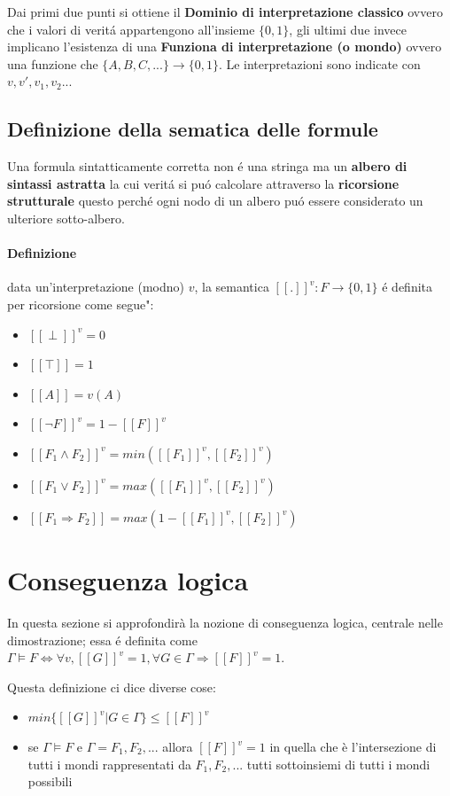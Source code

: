 \documentclass{article}
\begin{document}
Dai primi due punti si ottiene il \textbf{Dominio di interpretazione classico} ovvero che i valori di veritá appartengono all'insieme $\{0,1\}$, gli ultimi due invece implicano l'esistenza di una \textbf{Funziona di interpretazione (o mondo)} ovvero una funzione che $\{A,B,C,...\} \rightarrow \{0,1\}$. Le interpretazioni sono indicate con $v,v',v_1,v_2...$

\subsection{Definizione della sematica delle formule}
Una formula sintatticamente corretta non é una stringa ma un \textbf{albero di sintassi astratta} la cui veritá si puó calcolare attraverso la \textbf{ricorsione strutturale} questo perché ogni nodo di un albero puó essere considerato un ulteriore sotto-albero.
\paragraph{Definizione} data un'interpretazione (modno) $v$, la semantica $[[.]]^v:F \rightarrow \{0,1\}$ é definita per ricorsione come segue":
\begin{itemize}
    \item $[[\perp]]^v = 0$
    \item $[[\top]] = 1$
    \item $[[A]]=v(A)$
    \item $[[\neg F]]^v= 1 - [[F]]^v$
    \item $[[F_1 \land F_2]]^v = min([[F_1]]^v,[[F_2]]^v)$
    \item $[[F_1 \lor F_2]]^v = max([[F_1]]^v,[[F_2]]^v)$
    \item $[[F_1 \Rightarrow F_2]] = max(1-[[F_1]]^v,[[F_2]]^v)$
\end{itemize}

\section{Conseguenza logica}
In questa sezione si approfondirà la nozione di conseguenza logica, centrale nelle dimostrazione; essa é definita come $\Gamma \vDash F \Leftrightarrow \forall v, [[G]]^v = 1, \forall G \in \Gamma \Rightarrow [[F]]^v =1$.

Questa definizione ci dice diverse cose:
\begin{itemize}
    \item $min \{[[G]]^v | G\in \Gamma\} \le [[F]]^v$
    \item se $\Gamma \vDash F$ e $\Gamma = F_1, F_2,...$ allora $[[F]]^v = 1$ in quella che è l'intersezione di tutti i mondi rappresentati da $F_1, F_2,...$ tutti sottoinsiemi di tutti i mondi possibili
\end{itemize}
\end{document}
